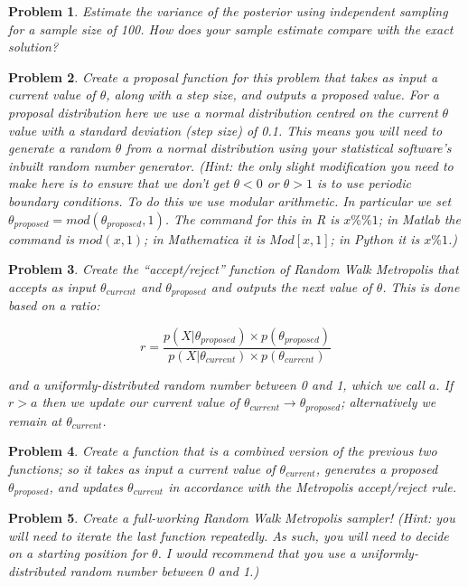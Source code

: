 \documentclass{article}
\newtheorem{problem}{Problem}[section]
\begin{document}
\begin{problem}
Estimate the variance of the posterior using independent sampling for a sample size of 100. How does your sample estimate compare with the exact solution?
\end{problem}

\begin{problem}
Create a proposal function for this problem that takes as input a current value of $\theta$, along with a step size, and outputs a proposed value. For a proposal distribution here we use a normal distribution centred on the current $\theta$ value with a standard deviation (step size) of 0.1. This means you will need to generate a random $\theta$ from a normal distribution using your statistical software's inbuilt random number generator. (Hint: the only slight modification you need to make here is to ensure that we don't get $\theta < 0$ or $\theta > 1$ is to use periodic boundary conditions. To do this we use modular arithmetic. In particular we set $\theta_{proposed} = mod(\theta_{proposed},1)$. The command for this in R is $x \%\% 1$; in Matlab the command is $mod(x,1)$; in Mathematica it is $Mod[x,1]$; in Python it is $x \% 1$.)
\end{problem}

\begin{problem}
Create the ``accept/reject'' function of Random Walk Metropolis that accepts as input $\theta_{current}$ and $\theta_{proposed}$ and outputs the next value of $\theta$. This is done based on a ratio:

\begin{equation}
r = \frac{p(X|\theta_{proposed}) \times p(\theta_{proposed})}{p(X|\theta_{current}) \times p(\theta_{current})}
\end{equation}

and a uniformly-distributed random number between 0 and 1, which we call $a$. If $r > a$ then we update our current value of $\theta_{current} \rightarrow \theta_{proposed}$; alternatively we remain at $\theta_{current}$. 
\end{problem}

\begin{problem}
Create a function that is a combined version of the previous two functions; so it takes as input a current value of $\theta_{current}$, generates a proposed $\theta_{proposed}$, and updates $\theta_{current}$ in accordance with the Metropolis accept/reject rule.
\end{problem}

\begin{problem}
Create a full-working Random Walk Metropolis sampler! (Hint: you will need to iterate the last function repeatedly. As such, you will need to decide on a starting position for $\theta$. I would recommend that you use a uniformly-distributed random number between 0 and 1.)
\end{problem}
\end{document}
